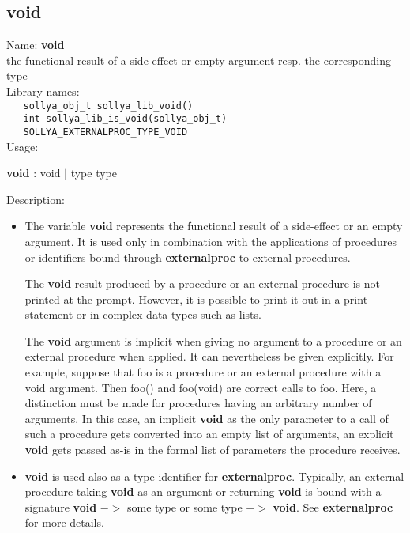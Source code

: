\subsection{void}
\label{labvoid}
\noindent Name: \textbf{void}\\
\phantom{aaa}the functional result of a side-effect or empty argument resp. the corresponding type\\[0.2cm]
\noindent Library names:\\
\verb|   sollya_obj_t sollya_lib_void()|\\
\verb|   int sollya_lib_is_void(sollya_obj_t)|\\
\verb|   SOLLYA_EXTERNALPROC_TYPE_VOID|\\[0.2cm]
\noindent Usage: 
\begin{center}
\textbf{void} : \textsf{void} $|$ \textsf{type type}\\
\end{center}
\noindent Description: \begin{itemize}

\item The variable \textbf{void} represents the functional result of a
   side-effect or an empty argument.  It is used only in combination with
   the applications of procedures or identifiers bound through
   \textbf{externalproc} to external procedures.
    
   The \textbf{void} result produced by a procedure or an external procedure
   is not printed at the prompt. However, it is possible to print it out
   in a print statement or in complex data types such as lists.
    
   The \textbf{void} argument is implicit when giving no argument to a
   procedure or an external procedure when applied. It can nevertheless be given
   explicitly.  For example, suppose that foo is a procedure or an
   external procedure with a void argument. Then foo() and foo(void) are
   correct calls to foo. Here, a distinction must be made for procedures having an
   arbitrary number of arguments. In this case, an implicit \textbf{void}
   as the only parameter to a call of such a procedure gets converted into 
   an empty list of arguments, an explicit \textbf{void} gets passed as-is in the
   formal list of parameters the procedure receives.

\item \textbf{void} is used also as a type identifier for
   \textbf{externalproc}. Typically, an external procedure taking \textbf{void} as an
   argument or returning \textbf{void} is bound with a signature \textbf{void} $->$
   some type or some type $->$ \textbf{void}. See \textbf{externalproc} for more
   details.
\end{itemize}
